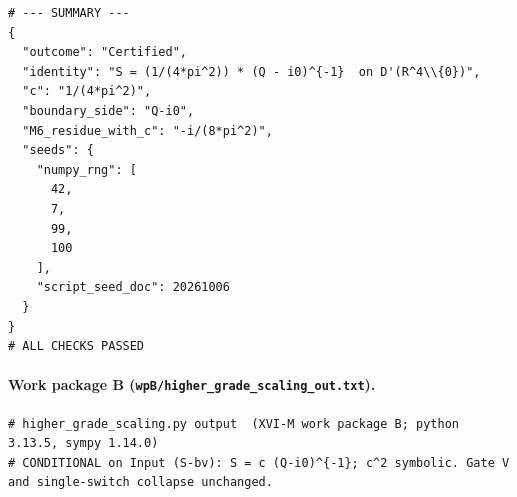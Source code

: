 \documentclass{article}
\theoremstyle{remark}
\begin{document}
\begin{lstlisting}
# --- SUMMARY ---
{
  "outcome": "Certified",
  "identity": "S = (1/(4*pi^2)) * (Q - i0)^{-1}  on D'(R^4\\{0})",
  "c": "1/(4*pi^2)",
  "boundary_side": "Q-i0",
  "M6_residue_with_c": "-i/(8*pi^2)",
  "seeds": {
    "numpy_rng": [
      42,
      7,
      99,
      100
    ],
    "script_seed_doc": 20261006
  }
}
# ALL CHECKS PASSED
\end{lstlisting}

\paragraph{Work package B (\texttt{wpB/higher\_grade\_scaling\_out.txt}).}
\begin{lstlisting}
# higher_grade_scaling.py output  (XVI-M work package B; python 3.13.5, sympy 1.14.0)
# CONDITIONAL on Input (S-bv): S = c (Q-i0)^{-1}; c^2 symbolic. Gate V and single-switch collapse unchanged.


\end{lstlisting}
\end{document}
